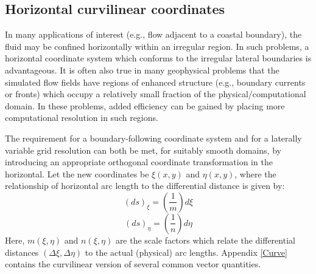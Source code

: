 \subsection{Horizontal curvilinear coordinates}
\label{Ocurve}
In many applications of interest (e.g., flow adjacent to a coastal
boundary), the fluid may be confined horizontally within an
irregular region.  In such problems, a horizontal coordinate system
which conforms to the irregular lateral boundaries is advantageous.
It is often also true in many geophysical problems that the
simulated flow fields have regions of enhanced structure (e.g.,
boundary currents or fronts) which occupy a relatively small
fraction of the physical/computational domain.  In these problems,
added efficiency can be gained by placing more computational
resolution in such regions.

The requirement for a boundary-following coordinate system and for a
laterally variable grid resolution can both be met, for suitably
smooth domains, by introducing an appropriate orthogonal coordinate
transformation in the horizontal.  Let the new coordinates be $\xi
(x,y)$ and $\eta(x,y)$, where the relationship of horizontal arc
length to the differential distance is given by:
\begin{equation}
   (ds)_\xi = \left( \frac{1}{m} \right) d \xi
\end{equation}
\begin{equation}
   (ds)_\eta = \left( \frac{1}{n} \right) d \eta
\end{equation}
Here, $m(\xi,\eta)$ and $n(\xi,\eta)$ are the scale factors which
relate the differential distances $(\Delta \xi,\Delta \eta)$ to the
actual (physical) arc lengths.  Appendix \ref{Curve} contains the
curvilinear version of several common vector quantities.

